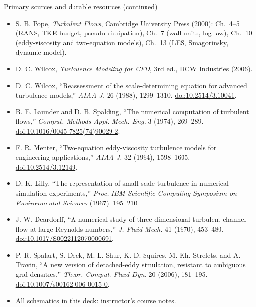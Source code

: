 \documentclass[aspectratio=169,11pt]{beamer}
\begin{document}
\begin{frame}{Primary sources and durable resources (continued)}
\scriptsize
\begin{itemize}\itemsep3pt
  \item S. B. Pope, \emph{Turbulent Flows}, Cambridge University Press (2000): Ch.~4--5 (RANS, TKE budget, pseudo-dissipation), Ch.~7 (wall units, log law), Ch.~10 (eddy-viscosity and two-equation models), Ch.~13 (LES, Smagorinsky, dynamic model).
  \item D. C. Wilcox, \emph{Turbulence Modeling for CFD}, 3rd ed., DCW Industries (2006).
  \item D. C. Wilcox, ``Reassessment of the scale-determining equation for advanced turbulence models,'' \emph{AIAA J.} 26 (1988), 1299--1310. \href{https://doi.org/10.2514/3.10041}{doi:10.2514/3.10041}.
  \item B. E. Launder and D. B. Spalding, ``The numerical computation of turbulent flows,'' \emph{Comput. Methods Appl. Mech. Eng.} 3 (1974), 269--289. \href{https://doi.org/10.1016/0045-7825(74)90029-2}{doi:10.1016/0045-7825(74)90029-2}.
  \item F. R. Menter, ``Two-equation eddy-viscosity turbulence models for engineering applications,'' \emph{AIAA J.} 32 (1994), 1598--1605. \href{https://doi.org/10.2514/3.12149}{doi:10.2514/3.12149}.
  \item D. K. Lilly, ``The representation of small-scale turbulence in numerical simulation experiments,'' \emph{Proc. IBM Scientific Computing Symposium on Environmental Sciences} (1967), 195--210.
  \item J. W. Deardorff, ``A numerical study of three-dimensional turbulent channel flow at large Reynolds numbers,'' \emph{J. Fluid Mech.} 41 (1970), 453--480. \href{https://doi.org/10.1017/S0022112070000691}{doi:10.1017/S0022112070000691}.
  \item P. R. Spalart, S. Deck, M. L. Shur, K. D. Squires, M. Kh. Strelets, and A. Travin, ``A new version of detached-eddy simulation, resistant to ambiguous grid densities,'' \emph{Theor. Comput. Fluid Dyn.} 20 (2006), 181--195. \href{https://doi.org/10.1007/s00162-006-0015-0}{doi:10.1007/s00162-006-0015-0}.
  \item All schematics in this deck: instructor's course notes.
\end{itemize}
\end{frame}
\end{document}
